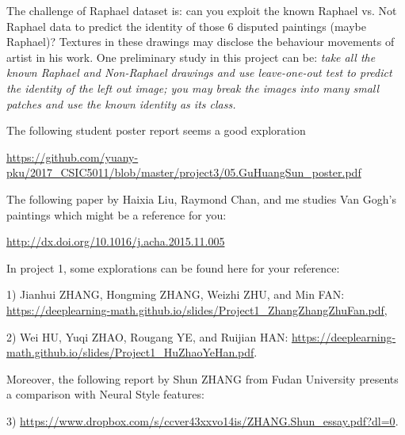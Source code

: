 \documentclass[11pt]{article}
\begin{document}
The challenge of Raphael dataset is: can you exploit the known Raphael vs. Not Raphael data to predict the identity of those 6 disputed paintings (maybe Raphael)? Textures in these drawings may disclose the behaviour movements of artist in his work. One preliminary study in this project can be: \emph{take all the known Raphael and Non-Raphael drawings and use leave-one-out test to predict the identity of the left out image; you may break the images into many small patches and use the known identity as its class.}      

The following student poster report seems a good exploration

\url{https://github.com/yuany-pku/2017_CSIC5011/blob/master/project3/05.GuHuangSun_poster.pdf}

The following paper by Haixia Liu, Raymond Chan, and me studies Van Gogh's paintings which might be a reference for you:

\url{http://dx.doi.org/10.1016/j.acha.2015.11.005}

In project 1, some explorations can be found here for your reference: 

1) Jianhui ZHANG, Hongming ZHANG, Weizhi ZHU, and Min FAN: \url{https://deeplearning-math.github.io/slides/Project1_ZhangZhangZhuFan.pdf},

2) Wei HU, Yuqi ZHAO, Rougang YE, and Ruijian HAN: \url{https://deeplearning-math.github.io/slides/Project1_HuZhaoYeHan.pdf}.

Moreover, the following report by Shun ZHANG from Fudan University presents a comparison with Neural Style features:

3) \url{https://www.dropbox.com/s/ccver43xxvo14is/ZHANG.Shun_essay.pdf?dl=0}.

%
%
%
%
%
\end{document}
